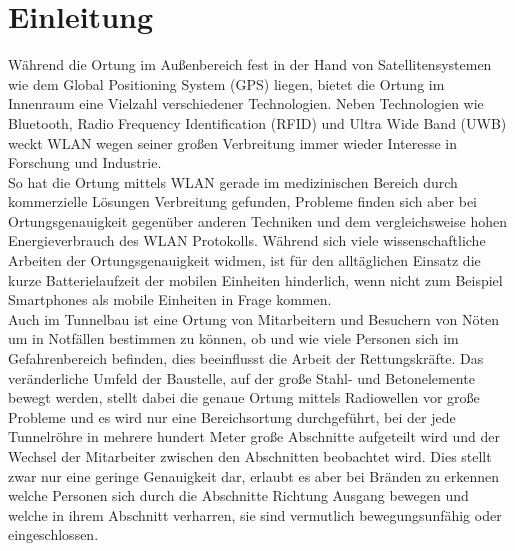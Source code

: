 \chapter{Einleitung}
\label{ch:Einleitung}
Während die Ortung im Außenbereich fest in der Hand von Satellitensystemen wie dem Global Positioning System (GPS) liegen, bietet die Ortung im Innenraum eine Vielzahl verschiedener Technologien. Neben Technologien wie Bluetooth, Radio Frequency Identification (RFID) und Ultra Wide Band (UWB) weckt WLAN wegen seiner großen Verbreitung immer wieder Interesse in Forschung und Industrie. \\
So hat die Ortung mittels WLAN gerade im medizinischen Bereich durch kommerzielle Lösungen Verbreitung gefunden, Probleme finden sich aber bei Ortungsgenauigkeit gegenüber anderen Techniken und dem vergleichsweise hohen Energieverbrauch des WLAN Protokolls.
Während sich viele wissenschaftliche Arbeiten der Ortungsgenauigkeit widmen, ist für den alltäglichen Einsatz die kurze Batterielaufzeit der mobilen Einheiten hinderlich, wenn nicht zum Beispiel Smartphones als mobile Einheiten in Frage kommen. \\
Auch im Tunnelbau ist eine Ortung von Mitarbeitern und Besuchern von Nöten um in Notfällen bestimmen zu können, ob und wie viele Personen sich im Gefahrenbereich befinden, dies beeinflusst die Arbeit der Rettungskräfte. 
Das veränderliche Umfeld der Baustelle, auf der große Stahl- und Betonelemente bewegt werden, stellt dabei die genaue Ortung mittels Radiowellen vor große Probleme und es wird nur eine Bereichsortung durchgeführt, bei der jede Tunnelröhre in mehrere hundert Meter große Abschnitte aufgeteilt wird und der Wechsel der Mitarbeiter zwischen den Abschnitten beobachtet wird. 
Dies stellt zwar nur eine geringe Genauigkeit dar, erlaubt es aber bei Bränden zu erkennen welche Personen sich durch die Abschnitte Richtung Ausgang bewegen und welche in ihrem Abschnitt verharren, sie sind vermutlich bewegungsunfähig oder eingeschlossen.\\ 


